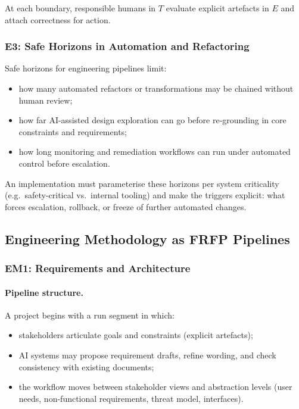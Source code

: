 At each boundary, responsible humans in $T$ evaluate explicit artefacts in
$E$ and attach correctness for action.

\subsubsection*{E3: Safe Horizons in Automation and Refactoring}

Safe horizons for engineering pipelines limit:

\begin{itemize}
  \item how many automated refactors or transformations may be chained without
        human review;
  \item how far AI-assisted design exploration can go before re-grounding in
        core constraints and requirements;
  \item how long monitoring and remediation workflows can run under automated
        control before escalation.
\end{itemize}

An implementation must parameterise these horizons per system criticality
(e.g.\ safety-critical vs.\ internal tooling) and make the triggers explicit:
what forces escalation, rollback, or freeze of further automated changes.

\subsection{Engineering Methodology as FRFP Pipelines}

\subsubsection*{EM1: Requirements and Architecture}

\paragraph{Pipeline structure.}
A project begins with a run segment in which:

\begin{itemize}
  \item stakeholders articulate goals and constraints (explicit artefacts);
  \item AI systems may propose requirement drafts, refine wording, and check
        consistency with existing documents;
\item the workflow moves between stakeholder views and abstraction levels
        (user needs, non-functional requirements, threat model, interfaces).
\end{itemize}


